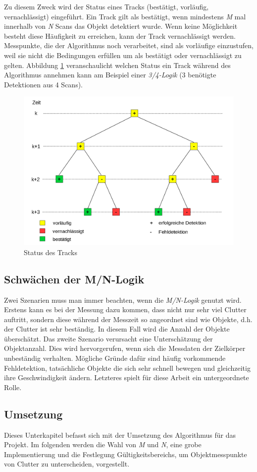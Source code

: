 \documentclass[10pt,a4paper]{article}
\begin{document}
	\newline
	Zu diesem Zweck wird der Status eines Tracks (bestätigt, vorläufig, vernachlässigt) eingeführt. Ein Track gilt als bestätigt, wenn mindestens \textit{M} mal innerhalb von \textit{N} Scans das Objekt detektiert wurde. Wenn keine Möglichkeit besteht diese Häufigkeit zu erreichen, kann der Track vernachlässigt werden. Messpunkte, die der Algorithmus noch verarbeitet, sind als vorläufige einzustufen, weil sie nicht die Bedingungen erfüllen um als bestätigt oder vernachlässigt zu gelten. Abbildung \ref{fig: Status des Tracks} veranschaulicht welchen Status ein Track während des Algorithmus annehmen kann am Beispiel einer \textit{3/4-Logik} (3 benötigte Detektionen aus 4 Scans).
\begin{figure}[h]
		\centering
		\includegraphics[width=0.7\linewidth]{./Pictures_report/Status des Tracks.png}
		\caption{Status des Tracks}
		\label{fig: Status des Tracks}
	\end{figure}
\subsection{Schwächen der M/N-Logik}
	Zwei Szenarien muss man immer beachten, wenn die \textit{M/N-Logik} genutzt wird. Erstens kann es bei der Messung dazu kommen, dass nicht nur sehr viel Clutter auftritt, sondern diese während der Messzeit so angeordnet sind wie Objekte, d.h. der Clutter ist sehr beständig. In diesem Fall wird die Anzahl der Objekte überschätzt.
	\newline
	Das zweite Szenario verursacht eine Unterschätzung der Objektanzahl. Dies wird hervorgerufen, wenn sich die Messdaten der Zielkörper unbeständig verhalten. Mögliche Gründe dafür sind häufig vorkommende Fehldetektion, tatsächliche Objekte die sich sehr schnell bewegen und gleichzeitig ihre Geschwindigkeit ändern. Letzteres spielt für diese Arbeit ein untergeordnete Rolle.
\subsection{Umsetzung}
	Dieses Unterkapitel befasst sich mit der Umsetzung des Algorithmus für das Projekt. Im folgenden werden die Wahl von \textit{M} und \textit{N}, eine grobe Implementierung und die Festlegung Gültigkeitsbereichs, um Objektmesspunkte von Clutter zu unterscheiden, vorgestellt. 
\end{document}
